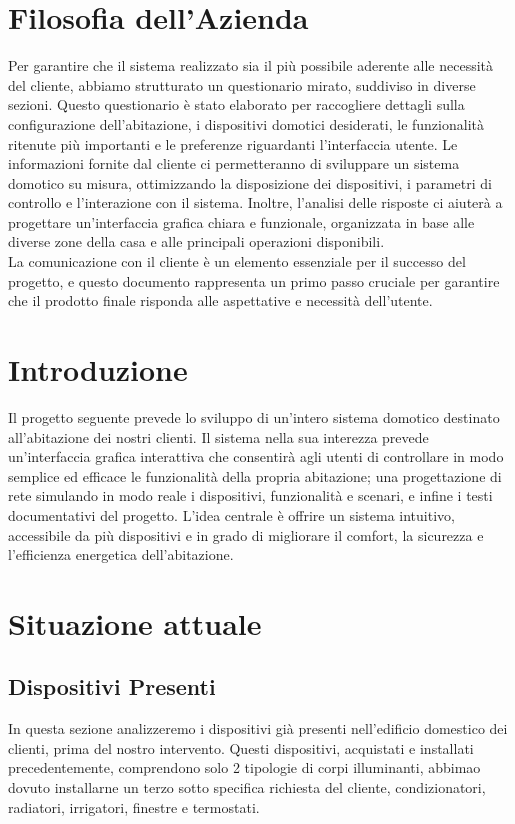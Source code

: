 \documentclass[italian, 12pt, a4paper]{article}
\begin{document}
\section{Filosofia dell'Azienda}\label{sec:filosofia}
Per garantire che il sistema realizzato sia il più possibile aderente alle necessità del cliente, abbiamo strutturato un questionario mirato, suddiviso in diverse sezioni. Questo questionario è stato elaborato per raccogliere dettagli sulla configurazione dell’abitazione, i dispositivi domotici desiderati, le funzionalità ritenute più importanti e le preferenze riguardanti l’interfaccia utente.
Le informazioni fornite dal cliente ci permetteranno di sviluppare un sistema domotico su misura, ottimizzando la disposizione dei dispositivi, i parametri di controllo e l’interazione con il sistema. Inoltre, l’analisi delle risposte ci aiuterà a progettare un’interfaccia grafica chiara e funzionale, organizzata in base alle diverse zone della casa e alle principali operazioni disponibili.\\[1.5mm]
La comunicazione con il cliente è un elemento essenziale per il successo del progetto, e questo documento rappresenta un primo passo cruciale per garantire che il prodotto finale risponda alle aspettative e necessità dell’utente.
\clearpage
\section{Introduzione}\label{sec:introduzione}
Il progetto seguente prevede lo sviluppo di un’intero sistema domotico destinato all'abitazione dei nostri clienti. Il sistema nella sua interezza prevede un'interfaccia grafica interattiva che consentirà agli utenti di controllare in modo semplice ed efficace le funzionalità della propria abitazione; una progettazione di rete simulando in modo reale i dispositivi, funzionalità e scenari, e infine i testi documentativi del progetto. L’idea centrale è offrire un sistema intuitivo, accessibile da più dispositivi e in grado di migliorare il comfort, la sicurezza e l’efficienza energetica dell'abitazione.\\[1.5mm]
\clearpage
\section{Situazione attuale}\label{sec:situazione}
\subsection{Dispositivi Presenti}
In questa sezione analizzeremo i dispositivi già presenti nell'edificio domestico dei clienti, prima del nostro intervento. Questi dispositivi, acquistati e installati precedentemente, comprendono solo 2 tipologie di corpi illuminanti, abbimao dovuto installarne un terzo sotto specifica richiesta del cliente, condizionatori, radiatori, irrigatori, finestre e termostati.
\end{document}
